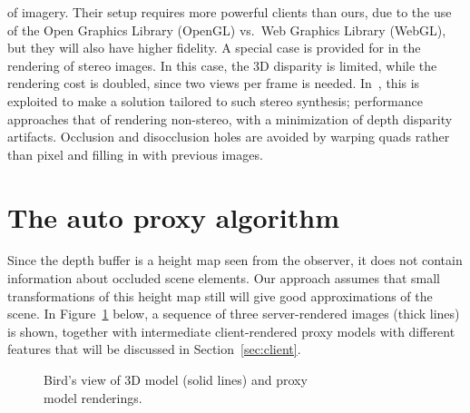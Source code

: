 \documentclass[10pt,conference,compsocconf]{IEEEtran}
\newcommand{\etal}{{et~al.}}
\begin{document}
of imagery. Their setup requires more powerful clients than ours, due to the use
of the Open Graphics Library (OpenGL) vs.~Web Graphics Library (WebGL), but they
will also have higher fidelity.
%
A special case is provided for in the rendering of stereo images. In this case,
the 3D disparity is limited, while the rendering cost is doubled, since two
views per frame is needed. In~\cite{DidykERMS2010}, this is exploited to make a
solution tailored to such stereo synthesis; performance approaches that of
rendering non-stereo, with a minimization of depth disparity
artifacts. Occlusion and disocclusion holes are avoided by warping quads rather
than pixel and filling in with previous images.
%







\section{The auto proxy algorithm}
\label{sec:autoproxy}

Since the depth buffer is a height map seen from the observer, it
does not contain information about occluded scene elements. Our approach assumes
that small transformations of this height map still will give good
approximations of the scene. In Figure~\ref{fig:2DheightmapRotated} below, a
sequence of three server-rendered images (thick lines) is shown, together with
intermediate client-rendered proxy models with different features that will be
discussed in Section~\ref{sec:client}.

\begin{figure}[htb]
  \centering
  \caption{\label{fig:2DheightmapRotated}
Bird's view of 3D model (solid lines) and proxy\\model renderings.
}
\end{figure}

\end{document}
